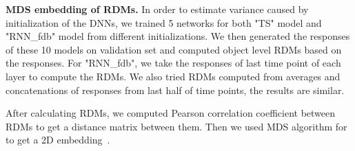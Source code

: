 \textbf{MDS embedding of RDMs.} In order to estimate variance caused by initialization of the DNNs, we trained 5 networks for both "TS" model and "RNN\_fdb" model from different initializations. 
We then generated the responses of these 10 models on validation set and computed object level RDMs based on the responses. 
For "RNN\_fdb", we take the responses of last time point of each layer to compute the RDMs. 
We also tried RDMs computed from averages and concatenations of responses from last half of time points, the results are similar.

After calculating RDMs, we computed Pearson correlation coefficient between RDMs to get a distance matrix between them. Then we used MDS algorithm for to get a 2D embedding~\cite{borg2005modern}. 

